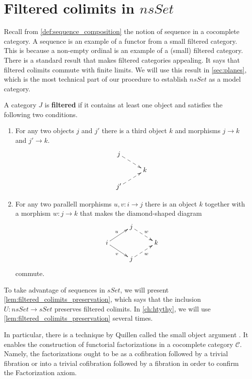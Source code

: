 

\section{Filtered colimits in $nsSet$}
\label{sec:smallness}

Recall from \cref{def:sequence_composition} the notion of sequence in a cocomplete category. A sequence is an example of a functor from a small filtered category. This is because a non-empty ordinal is an example of a (small) filtered category. There is a standard result that makes filtered categories appealing. It says that filtered colimits commute with finite limits. We will use this result in \cref{sec:planes}, which is the most technical part of our procedure to establish $nsSet$ as a model category.
\begin{definition}\label{def:filtered_category}
A category $J$ is \textbf{filtered} if it contains at least one object and satisfies the following two conditions.
\begin{enumerate}
\item{For any two objects $j$ and $j'$ there is a third object $k$ and morphisms $j\to k$ and $j'\to k$.
\begin{displaymath}
\xymatrix@=1em{
j \ar@{-->}[drr] \\
&& k \\
j' \ar@{-->}[urr]
}
\end{displaymath}
}
\item{For any two parallell morphisms $u,v:i\to j$ there is an object $k$ together with a morphism $w:j\to k$ that makes the diamond-shaped diagram
\begin{displaymath}
\xymatrix@=1em{
&& j \ar@{-->}[drr]^w \\
i \ar[drr]_v \ar[urr]^u &&&& k \\
&& j \ar@{-->}[urr]_w
}
\end{displaymath}
commute.
}
\end{enumerate}
\end{definition}
To take advantage of sequences in $sSet$, we will present \cref{lem:filtered_colimits_preservation}, which says that the inclusion $U:nsSet\to sSet$ preserves filtered colimits. In \cref{ch:htythy}, we will use \cref{lem:filtered_colimits_preservation} several times.

In particular, there is a technique by Quillen \cite{Qu67} called the small object argument \cite[Prop.~10.5.16, p.~198]{Hi03}. It enables the construction of functorial factorizations in a cocomplete category $\mathscr{C}$. Namely, the factorizations ought to be as a cofibration followed by a trivial fibration or into a trivial cofibration followed by a fibration in order to confirm the Factorization axiom.

